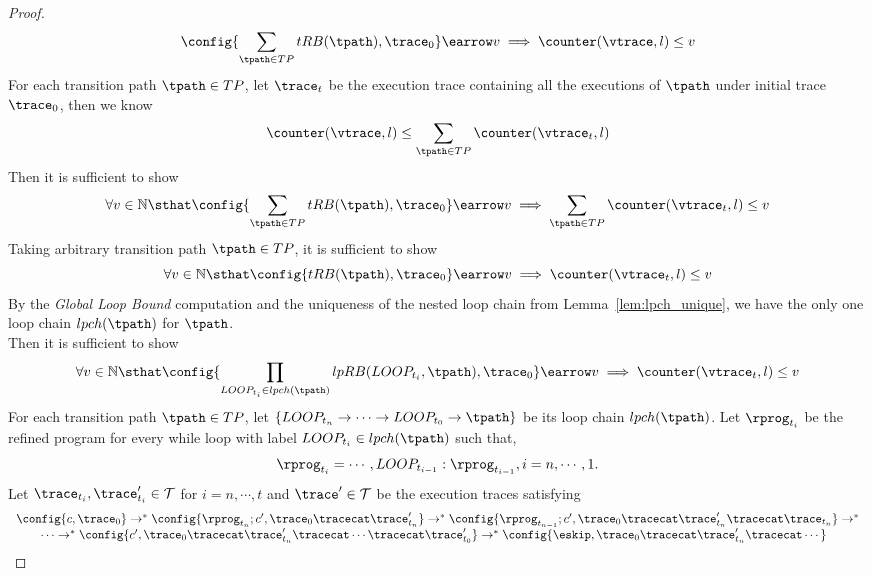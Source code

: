 \begin{proof}
\[          \config{\sum\limits_{\tpath \in TP} tRB(\tpath), \trace_0
          } \earrow v \implies  \counter(\vtrace, l) \leq v
          \]
          For each transition path $\tpath \in TP$, let $\trace_t$ be the execution trace 
          containing all the executions of $\tpath$
          under initial trace $\trace_0$, then we know 
          \[
            \counter(\vtrace, l) \leq \sum_{\tpath \in TP} \counter(\vtrace_t, l) 
          \]
          Then it is sufficient to show 
          \[
          \forall v \in \mathbb{N} \sthat 
          \config{\sum\limits_{\tpath \in TP} tRB(\tpath), \trace_0
          } \earrow v \implies \sum_{\tpath \in TP} \counter(\vtrace_t, l) \leq v
          \]
          Taking arbitrary transition path $\tpath \in TP$, it is sufficient to show 
          \[
            \forall v \in \mathbb{N} \sthat 
            \config{tRB(\tpath), \trace_0
            } \earrow v \implies \counter(\vtrace_t, l) \leq v
            \]
          By the \emph{Global Loop Bound} computation and the uniqueness of the 
          nested loop chain from Lemma~\ref{lem:lpch_unique}, 
          we have the only one loop chain $lpch(\tpath)$ for $\tpath$.
          \\
          Then it is sufficient to show 
          \[
            \forall v \in \mathbb{N} \sthat 
          \config{\prod_{LOOP_{t_i} \in lpch(\tpath)} lpRB(LOOP_{t_i}, \tpath), \trace_0
          } \earrow v \implies  \counter(\vtrace_t, l) \leq v
        \]
        For each transition path $\tpath \in TP$, 
        let $\{LOOP_{t_n} \to \cdots \to LOOP_{t_0} \to \tpath\}$
        be its loop chain $lpch(\tpath)$. 
        Let $\rprog_{t_i}$ be the refined program for every while loop 
        with label $LOOP_{t_i} \in lpch(\tpath)$ such that,
        \[
          \rprog_{t_{i}} = \cdots, LOOP_{t_{i - 1}}:\rprog_{t_{i - 1}}, i = n, \cdots, {1}.
        \] 
        Let $\trace_{t_i}, \trace_{t_i}' \in \mathcal{T}$ for $i = n, \cdots, t$ and $\trace' \in \mathcal{T}$ be the execution traces satisfying
        \[
          \begin{array}{l}
          \config{c, \trace_0} \to^{*} \config{\rprog_{t_n};c', \trace_0 \tracecat \trace_{t_n}'}
        \to^{*} \config{\rprog_{t_{n - 1}};c', \trace_0 \tracecat \trace_{t_n}' \tracecat \trace_{t_n}}
        \to^{*} 
        \\ \qquad 
        \cdots \to^{*} \config{c', \trace_0 \tracecat \trace_{t_n}' \tracecat \cdots \tracecat
        \trace_{t_0}'} \to^{*} \config{\eskip, \trace_0 \tracecat \trace_{t_n}' \tracecat \cdots 
}
\end{array}\]
\end{proof}

